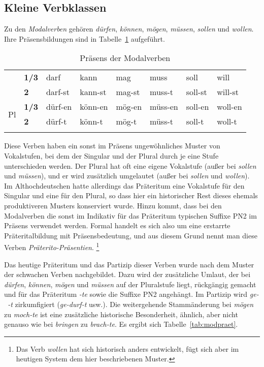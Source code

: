 \subsection{Kleine Verbklassen}

\label{sec:kleineverbklassen}


Zu den \textit{Modalverben} gehören \textit{dürfen}, \textit{können}, \textit{mögen}, \textit{müssen}, \textit{sollen} und \textit{wollen}.
Ihre Präsensbildungen sind in Tabelle~\ref{tab:modpraes} aufgeführt.


\begin{table}
  \centering
  \begin{tabular}{llllllll}
    \lsptoprule
    \multirow{2}{*}{\textbf{Sg}} & \textbf{1/3} & darf & kann & mag & muss & soll & will \\
    & \textbf{2} & darf-st & kann-st & mag-st & muss-t & soll-st & will-st \\
    \midrule
    \multirow{2}{*}{Pl} & \textbf{1/3} & dürf-en & könn-en & mög-en & müss-en & soll-en & woll-en \\
    & \textbf{2} & dürf-t & könn-t & mög-t & müss-t & soll-t & woll-t \\
    \lspbottomrule
  \end{tabular}
  \caption{Präsens der Modalverben}
  \label{tab:modpraes}
\end{table}

Diese Verben haben ein sonst im Präsens ungewöhnliches Muster von Vokalstufen, bei dem der Singular und der Plural durch je eine Stufe unterschieden werden.
Der Plural hat oft eine eigene Vokalstufe (außer bei \textit{sollen} und \textit{müssen}), und er wird zusätzlich umgelautet (außer bei \textit{sollen} und \textit{wollen}).
Im Althochdeutschen hatte allerdings das Präteritum eine Vokalstufe für den Singular und eine für den Plural, so dass hier ein historischer Rest dieses ehemals produktiveren Musters konserviert wurde.
Hinzu kommt, dass bei den Modalverben die sonst im Indikativ für das Präteritum typischen Suffixe PN2 im Präsens verwendet werden.
Formal handelt es sich also um eine erstarrte Präteritalbildung mit Präsensbedeutung, und aus diesem Grund nennt man diese Verben \textit{Präterito-Präsentien}.%
\footnote{Das Verb \textit{wollen} hat sich historisch anders entwickelt, fügt sich aber im heutigen System dem hier beschriebenen Muster.}

Das heutige Präteritum und das Partizip dieser Verben wurde nach dem Muster der schwachen Verben nachgebildet.
Dazu wird der zusätzliche Umlaut, der bei \textit{dürfen}, \textit{können}, \textit{mögen} und \textit{müssen} auf der Pluralstufe liegt, rückgängig gemacht und für das Präteritum \textit{-te} sowie die Suffixe PN2 angehängt.
Im Partizip wird \mbox{\textit{ge-~-t}} zirkumfigiert (\textit{ge-durf-t} usw.).
Die weitergehende Stammänderung bei \textit{mögen} zu \textit{moch-te} ist eine zusätzliche historische Besonderheit, ähnlich, aber nicht genauso wie bei \textit{bringen} zu \textit{brach-te}.
Es ergibt sich Tabelle~\ref{tab:modpraet}.

